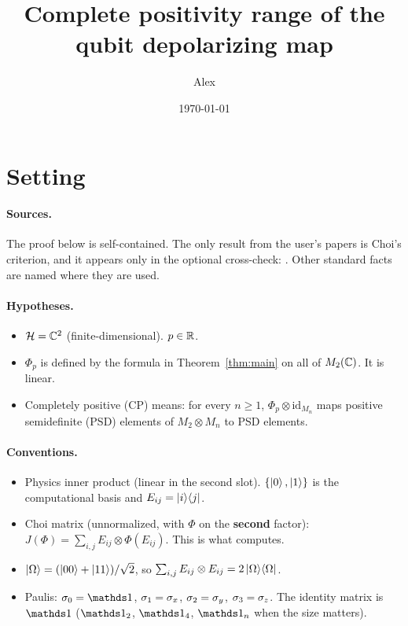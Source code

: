 \documentclass[11pt]{article}
\title{Complete positivity range of the qubit depolarizing map}
\author{Alex}
\date{\today}
\begin{document}
\maketitle

\section*{Setting}

\paragraph{Sources.} The proof below is self-contained. The only result from the user's papers
is Choi's criterion, and it appears only in the optional cross-check:
\cite[unnumbered statement before Lemma~67, p.~25 (PDF page)]{bu-gu-jaffe-magic}. Other standard
facts are named where they are used.

\paragraph{Hypotheses.}
\begin{itemize}
  \item[H1.] $\mathcal{H}=\mathbb{C}^2$ (finite-dimensional). $p\in\mathbb{R}$.
  \item[H2.] $\Phi_p$ is defined by the formula in Theorem~\ref{thm:main} on all of $M_2(\mathbb{C})$. It
    is linear.
  \item[H3.] Completely positive (CP) means: for every $n\ge1$, $\Phi_p\otimes\mathrm{id}_{M_n}$
    maps positive semidefinite (PSD) elements of $M_2\otimes M_n$ to PSD elements.
\end{itemize}

\paragraph{Conventions.}
\begin{itemize}
  \item Physics inner product (linear in the second slot). $\{\left\lvert 0 \right\rangle,\left\lvert 1 \right\rangle\}$ is the
    computational basis and $E_{ij}=\left\lvert i \right\rangle\!\left\langle j \right\rvert$.
  \item Choi matrix (unnormalized, with $\Phi$ on the \textbf{second} factor):
    $J(\Phi)=\sum_{i,j}E_{ij}\otimes\Phi(E_{ij})$. This is what 
    computes.
  \item $\left\lvert \Omega \right\rangle=(\left\lvert 00 \right\rangle+\left\lvert 11 \right\rangle)/\sqrt2$, so
    $\sum_{i,j}E_{ij}\otimes E_{ij}=2\left\lvert \Omega \right\rangle\!\left\langle \Omega \right\rvert$.
  \item Paulis: $\sigma_0=\id$, $\sigma_1=\sigma_x$, $\sigma_2=\sigma_y$, $\sigma_3=\sigma_z$. The identity
    matrix is $\id$ ($\id_2$, $\id_4$, $\id_n$ when the size matters).
\end{itemize}
\end{document}
